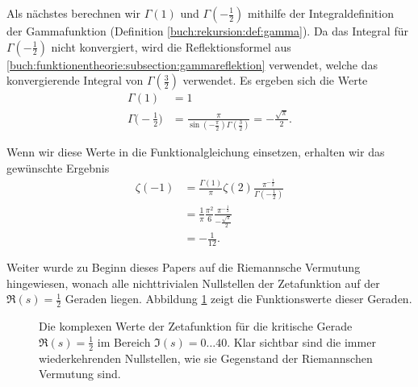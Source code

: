 Als nächstes berechnen wir $\Gamma(1)$ und $\Gamma(-\frac{1}{2})$ mithilfe der Integraldefinition der Gammafunktion (Definition \ref{buch:rekursion:def:gamma}).
Da das Integral für $\Gamma(-\frac{1}{2})$ nicht konvergiert, wird die Reflektionsformel aus \ref{buch:funktionentheorie:subsection:gammareflektion} verwendet, welche das konvergierende Integral von  $\Gamma(\frac{3}{2})$ verwendet.
Es ergeben sich die Werte
\begin{align*}
    \Gamma(1)
    &= 1\\
    \Gamma\biggl(-\frac{1}{2}\biggr)
    &= \frac{\pi}{\sin\left(-\frac{\pi}{2}\right)
    \Gamma\left(\frac{3}{2}\right)}
    = -\frac{\sqrt{\pi}}{2}.
\end{align*}

Wenn wir diese Werte in die Funktionalgleichung einsetzen, erhalten wir das gewünschte Ergebnis
\begin{align*}
    \zeta(-1)
    &=
    \frac{\Gamma(1)}{\pi}
    \zeta(2)
    \frac{\pi^{-\frac{1}{2}}}{\Gamma \left( -\frac{1}{2} \right)}
    \\
    &=
    \frac{1}{\pi}
    \frac{\pi^2}{6}
    \frac{\pi^{-\frac{1}{2}}}{
    -\frac{\sqrt{\pi}}{2}}
    \\
    &=
    -\frac{1}{12}.
\end{align*}

Weiter wurde zu Beginn dieses Papers auf die Riemannsche Vermutung hingewiesen, wonach alle nichttrivialen Nullstellen der Zetafunktion auf der $\Re(s)=\frac{1}{2}$ Geraden liegen.
Abbildung \ref{zeta:fig:einzweitel} zeigt die Funktionswerte dieser Geraden.
\begin{figure}
    \centering
    
    \caption{Die komplexen Werte der Zetafunktion für die kritische Gerade $\Re(s)=\frac{1}{2}$ im Bereich $\Im(s) = 0\dots40$.
    Klar sichtbar sind die immer wiederkehrenden Nullstellen, wie sie Gegenstand der Riemannschen Vermutung sind.}
    \label{zeta:fig:einzweitel}
\end{figure}
